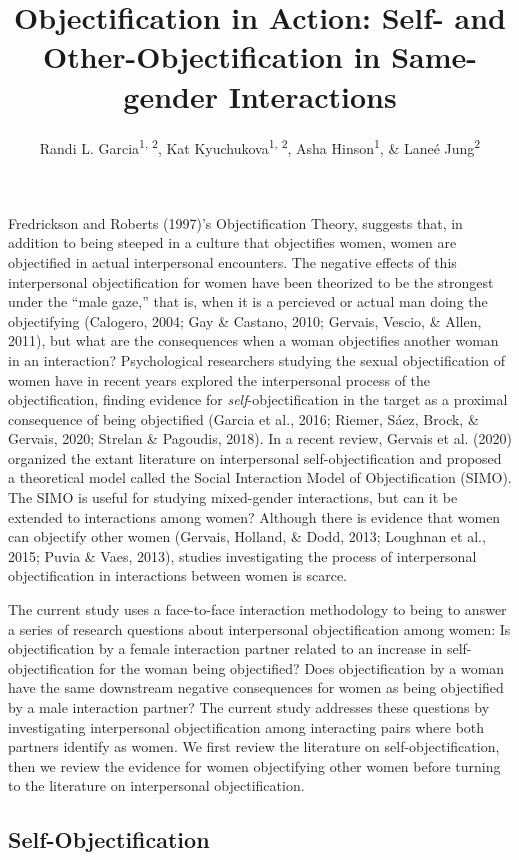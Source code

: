 \documentclass[man]{apa6}
\title{Objectification in Action: Self- and Other-Objectification in
Same-gender Interactions}
\author{Randi L. Garcia\textsuperscript{1, 2}, Kat
Kyuchukova\textsuperscript{1, 2}, Asha Hinson\textsuperscript{1}, \&
Laneé Jung\textsuperscript{2}}
\date{}
\affiliation{
\vspace{0.5cm}
\textsuperscript{1} Department of Psychology, Smith College\\\textsuperscript{2} Program in Statistical and Data Sciences, Smith College}
\begin{document}
\maketitle

Fredrickson and Roberts (1997)'s Objectification Theory, suggests that,
in addition to being steeped in a culture that objectifies women, women
are objectified in actual interpersonal encounters. The negative effects
of this interpersonal objectification for women have been theorized to
be the strongest under the \enquote{male gaze,} that is, when it is a
percieved or actual man doing the objectifying (Calogero, 2004; Gay \&
Castano, 2010; Gervais, Vescio, \& Allen, 2011), but what are the
consequences when a woman objectifies another woman in an interaction?
Psychological researchers studying the sexual objectification of women
have in recent years explored the interpersonal process of the
objectification, finding evidence for \emph{self}-objectification in the
target as a proximal consequence of being objectified (Garcia et al.,
2016; Riemer, Sáez, Brock, \& Gervais, 2020; Strelan \& Pagoudis, 2018).
In a recent review, Gervais et al. (2020) organized the extant
literature on interpersonal self-objectification and proposed a
theoretical model called the Social Interaction Model of Objectification
(SIMO). The SIMO is useful for studying mixed-gender interactions, but
can it be extended to interactions among women? Although there is
evidence that women can objectify other women (Gervais, Holland, \&
Dodd, 2013; Loughnan et al., 2015; Puvia \& Vaes, 2013), studies
investigating the process of interpersonal objectification in
interactions between women is scarce.

The current study uses a face-to-face interaction methodology to being
to answer a series of research questions about interpersonal
objectification among women: Is objectification by a female interaction
partner related to an increase in self-objectification for the woman
being objectified? Does objectification by a woman have the same
downstream negative consequences for women as being objectified by a
male interaction partner? The current study addresses these questions by
investigating interpersonal objectification among interacting pairs
where both partners identify as women. We first review the literature on
self-objectification, then we review the evidence for women objectifying
other women before turning to the literature on interpersonal
objectification.

\subsection{Self-Objectification}\label{self-objectification}
\end{document}
